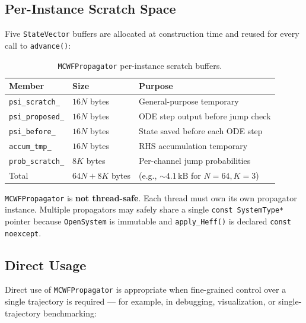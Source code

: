 \documentclass[11pt,a4paper,twoside]{book}
\newcommand{\code}[1]{\texttt{\small#1}}
\theoremstyle{definition}
\theoremstyle{remark}
\begin{document}
\subsection{Per-Instance Scratch Space}
\label{subsec:propagator-scratch}

Five \code{StateVector} buffers are allocated at construction time
and reused for every call to \code{advance()}:

\begin{table}[H]
\centering
\caption{\code{MCWFPropagator} per-instance scratch buffers.}
\label{tab:propagator-scratch}
\begin{tabular}{lll}
\toprule
\textbf{Member} & \textbf{Size} & \textbf{Purpose} \\
\midrule
\code{psi\_scratch\_}   & $16N$ bytes & General-purpose temporary \\
\code{psi\_proposed\_}  & $16N$ bytes & ODE step output before jump check \\
\code{psi\_before\_}    & $16N$ bytes & State saved before each ODE step \\
\code{accum\_tmp\_}     & $16N$ bytes & RHS accumulation temporary \\
\code{prob\_scratch\_}  & $8K$ bytes  & Per-channel jump probabilities \\
\midrule
Total & $64N + 8K$ bytes & (e.g., $\sim 4.1\,\mathrm{kB}$ for $N=64, K=3$) \\
\bottomrule
\end{tabular}
\end{table}

\begin{invbox}
  \code{MCWFPropagator} is \textbf{not thread-safe}. Each thread must
  own its own propagator instance. Multiple propagators may safely
  share a single \code{const SystemType*} pointer because
  \code{OpenSystem} is immutable and \code{apply\_Heff()} is
  declared \code{const noexcept}.
\end{invbox}

\subsection{Direct Usage}
\label{subsec:propagator-direct}

Direct use of \code{MCWFPropagator} is appropriate when fine-grained
control over a single trajectory is required — for example, in
debugging, visualization, or single-trajectory benchmarking:
\end{document}

